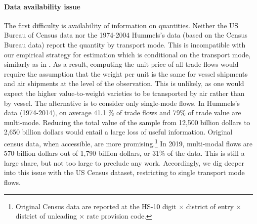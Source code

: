 \documentclass[11pt,twoside, authoryear]{elsarticle}
\begin{document}
\paragraph{Data availability issue} The first difficulty is availability of information on quantities. Neither the US Bureau of Census data nor the 1974-2004 Hummels's data (based on the Census Bureau data) report the quantity by transport mode. This is incompatible with our empirical strategy for estimation which is conditional on the transport mode, similarly as in \cite{hummels2007}. As a result, computing the unit price of all trade flows would require the assumption that the weight per unit is the same for vessel shipments and air shipments at the level of the observation. This is unlikely, as one would expect the higher value-to-weight varieties to be transported by air rather than by vessel. The alternative is to consider only single-mode flows. In Hummels's data (1974-2014), on average 41.1 \% of trade flows and 79\% of trade value are multi-mode. Reducing the total value of the sample from 12,500 billion dollars to 2,650 billion dollars would entail a large loss of useful information. Original census data, when accessible, are more promising.\footnote{Original Census data are  reported at the HS-10 digit $\times$ district of entry $\times$ district of unleading $\times$ rate provision code.} In 2019, multi-modal flows are 570 billion dollars out of 1,790 billion dollars, or 31\% of the data. This is still a large share, but not too large to preclude any work. Accordingly, we dig deeper into this issue with the US Census dataset, restricting to single transport mode flows. \smallskip
\end{document}
